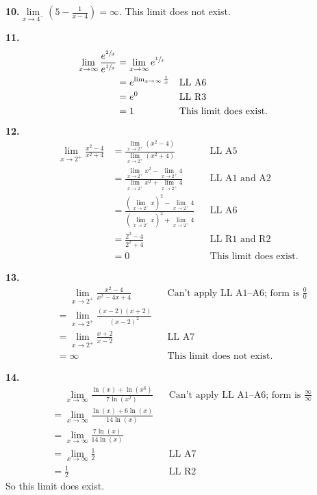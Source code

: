 \documentclass[10pt,oneside,]{book}
\theoremstyle{plain}
\theoremstyle{definition}
\numberwithin{equation}{section}
\newcommand{\fe}[2]{#1\mathopen{}\left(#2\right)\mathclose{}}
\begin{document}
\par\smallskip
\noindent\textbf{10.}\quad{}\(\lim\limits_{x\to4^{-}}\left(5-\frac{1}{x-4}\right)=\infty\). This limit does not exist.%
\par\smallskip
\noindent\textbf{11.}\quad{}\begin{align*}
\lim\limits_{x\to\infty}\frac{e^{\sfrac{2}{x}}}{e^{\sfrac{1}{x}}}&=\lim\limits_{x\to\infty}e^{\sfrac{1}{x}}\\
&=e^{\lim_{x\to\infty}\frac{1}{x}}&&\text{LL A6}\\
&=e^{0}&&\text{LL R3}\\
&=1&&\text{This limit does exist.}
\end{align*}%
\par\smallskip
\noindent\textbf{12.}\quad{}\begin{align*}
\lim\limits_{x\to2^{+}}\frac{x^2-4}{x^2+4}&=\frac{\lim\limits_{x\to2^{+}}\left(x^2-4\right)}{\lim\limits_{x\to2^{+}}\left(x^2+4\right)}&&\text{LL A5}\\
&=\frac{\lim\limits_{x\to2^{+}}x^2-\lim\limits_{x\to2^{+}}4}{\lim\limits_{x\to2^{+}}x^2+\lim\limits_{x\to2^{+}}4}&&\text{LL A1 and A2}\\
&=\frac{\left(\lim\limits_{x\to2^{+}}x\right)^2-\lim\limits_{x\to2^{+}}4}{\left(\lim\limits_{x\to2^{+}}x\right)^2+\lim\limits_{x\to2^{+}}4}&&\text{LL A6}\\
&=\frac{2^2-4}{2^2+4}&&\text{LL R1 and R2}\\
&=0&&\text{This limit does exist.}
\end{align*}%
\par\smallskip
\noindent\textbf{13.}\quad{}\begin{align*}
&\phantom{={}}\lim\limits_{x\to2^{+}}\frac{x^2-4}{x^2-4x+4}&&\text{Can't apply LL A1--A6; form is $\tfrac{0}{0}$}\\
&=\lim\limits_{x\to2^{+}}\frac{(x-2)(x+2)}{(x-2)^2}\\
&=\lim\limits_{x\to2^{+}}\frac{x+2}{x-2}&&\text{LL A7}\\
&=\infty&&\text{This limit does not exist.}
\end{align*}%
\par\smallskip
\noindent\textbf{14.}\quad{}\begin{align*}
&\phantom{={}}\lim\limits_{x\to\infty}\frac{\fe{\ln}{x}+\fe{\ln}{x^6}}{7\fe{\ln}{x^2}}&&\text{Can't apply LL A1--A6; form is $\tfrac{\infty}{\infty}$}\\
&=\lim\limits_{x\to\infty}\frac{\fe{\ln}{x}+6\fe{\ln}{x}}{14\fe{\ln}{x}}\\
&=\lim\limits_{x\to\infty}\frac{7\fe{\ln}{x}}{14\fe{\ln}{x}}\\
&=\lim\limits_{x\to\infty}\frac{1}{2}&&\text{LL A7}\\
&=\frac{1}{2}&&\text{LL R2}
\end{align*}So this limit does exist.%
\end{document}
